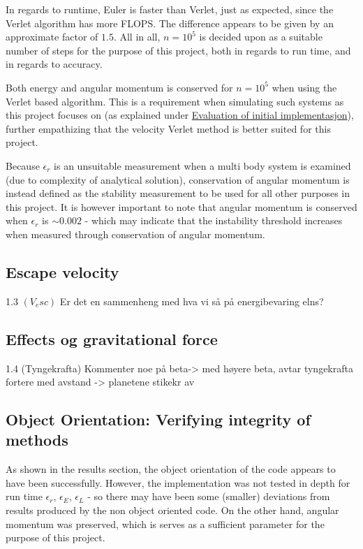 \documentclass[%
oneside,                 %
final,                   %
10pt]{article}
\begin{document}
In regards to runtime, Euler is faster than Verlet, just as expected, since the Verlet algorithm has more FLOPS. The difference appears to be given by an approximate factor of $1.5$. All in all, $n=10^5$ is decided upon as a suitable number of steps for the purpose of this project, both in regards to run time, and in regards to accuracy.\newline

Both energy and angular momentum is conserved for $n=10^5$ when using the Verlet based algorithm. This is a requirement when simulating such systems as this project focuses on (as explained under \hyperref[subsec:ev_of_init_impl]{Evaluation of initial implementasjon}), further empathizing that the velocity Verlet method is better suited for this project. \newline

Because $\epsilon_r$ is an unsuitable measurement when a multi body system is examined (due to complexity of analytical solution), conservation of angular momentum is instead defined as the stability measurement to be used for all other purposes in this project. It is however important to note that angular momentum is conserved when $\epsilon_r$ is $\sim 0.002$ - which may indicate that the instability threshold increases when measured through conservation of angular momentum. 

 
\subsection{Escape velocity}
1.3 $(V_esc)$ Er det en sammenheng med hva vi så på energibevaring elns? 
\subsection{Effects og gravitational force}
1.4 (Tyngekrafta) Kommenter noe på beta-> med høyere beta, avtar tyngekrafta fortere med avstand -> planetene stikekr av

\subsection{Object Orientation: Verifying integrity of methods} 
As shown in the results section, the object orientation of the code appears to have been successfully. However, the implementation was not tested in depth for run time $\epsilon_r$, $\epsilon_E$, $\epsilon_L$ - so there may have been some (smaller) deviations from results produced by the non object oriented code. On the other hand, angular momentum was preserved, which is serves as a sufficient parameter for the purpose of this project.
\end{document}
